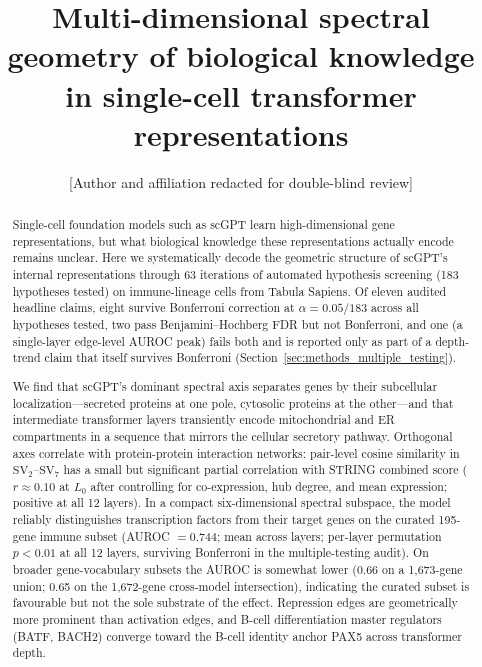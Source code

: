 \documentclass[12pt]{article}
\title{Multi-dimensional spectral geometry of biological knowledge in single-cell transformer representations}
\author{%
  [Author and affiliation redacted for double-blind review]
}
\date{}
\newcommand{\SV}[1]{\mathrm{SV}_{#1}}
\begin{document}
\linenumbers
\doublespacing
\maketitle

\begin{abstract}
Single-cell foundation models such as scGPT learn high-dimensional gene representations, but what biological knowledge these representations actually encode remains unclear.
Here we systematically decode the geometric structure of scGPT's internal representations through 63 iterations of automated hypothesis screening (183 hypotheses tested) on immune-lineage cells from Tabula Sapiens.
Of eleven audited headline claims, eight survive Bonferroni correction at $\alpha = 0.05/183$ across all hypotheses tested, two pass Benjamini--Hochberg FDR but not Bonferroni, and one (a single-layer edge-level AUROC peak) fails both and is reported only as part of a depth-trend claim that itself survives Bonferroni (Section~\ref{sec:methods_multiple_testing}).

We find that scGPT's dominant spectral axis separates genes by their subcellular localization---secreted proteins at one pole, cytosolic proteins at the other---and that intermediate transformer layers transiently encode mitochondrial and ER compartments in a sequence that mirrors the cellular secretory pathway.
Orthogonal axes correlate with protein-protein interaction networks: pair-level cosine similarity in $\SV{2}$--$\SV{7}$ has a small but significant partial correlation with STRING combined score ($r \approx 0.10$ at $L_0$ after controlling for co-expression, hub degree, and mean expression; positive at all 12 layers).
In a compact six-dimensional spectral subspace, the model reliably distinguishes transcription factors from their target genes on the curated 195-gene immune subset (AUROC $= 0.744$; mean across layers; per-layer permutation $p < 0.01$ at all 12 layers, surviving Bonferroni in the multiple-testing audit). On broader gene-vocabulary subsets the AUROC is somewhat lower (0.66 on a 1{,}673-gene union; 0.65 on the 1{,}672-gene cross-model intersection), indicating the curated subset is favourable but not the sole substrate of the effect.
Repression edges are geometrically more prominent than activation edges, and B-cell differentiation master regulators (BATF, BACH2) converge toward the B-cell identity anchor PAX5 across transformer depth.


\end{abstract}
\end{document}
